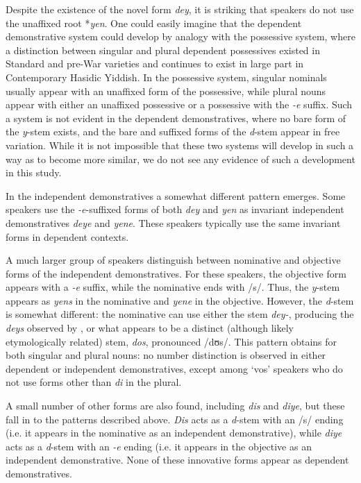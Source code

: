 \documentclass[output=paper, hidelinks]{langscibook}
\begin{document}
Despite the existence of the novel form \textit{dey}, it is striking that speakers do not use the unaffixed root *\textit{yen}. One could easily imagine that the dependent demonstrative system could develop by analogy with the possessive system, where a distinction between singular and plural dependent possessives existed in Standard and pre-War varieties and continues to exist in large part in Contemporary Hasidic Yiddish. In the possessive system, singular nominals usually appear with an unaffixed form of the possessive, while plural nouns appear with either an unaffixed possessive or a possessive with the \textit{-e} suffix. Such a system is not evident in the dependent demonstratives, where no bare form of the \textit{y}-stem exists, and the bare and suffixed forms of the \textit{d}-stem appear in free variation. While it is not impossible that these two systems will develop in such a way as to become more similar, we do not see any evidence of such a development in this study. 

\hspace*{-4.5pt}In the independent demonstratives a somewhat different pattern emerges. Some speakers use the \textit{-e}-suffixed forms of both \textit{dey} and \textit{yen} as invariant independent demonstratives \textit{deye} and \textit{yene}. These speakers typically use the same invariant forms in dependent contexts.

A much larger group of speakers distinguish between nominative and objective forms of the independent demonstratives. For these speakers, the objective form appears with a \textit{-e} suffix, while the nominative ends with /s/. Thus, the \textit{y}-stem appears as \textit{yens} in the nominative and \textit{yene} in the objective. However, the \textit{d}-stem is somewhat different: the nominative can use either the stem \textit{dey-}, producing the \textit{deys} observed by \citet{Krogh12}, or what appears to be a distinct (although likely etymologically related) stem, \textit{dos}, pronounced /dʊs/. This pattern obtains for both singular and plural nouns: no number distinction is observed in either dependent or independent demonstratives, except among `vos' speakers who do not use forms other than \textit{di} in the plural. 

A small number of other forms are also found, including \textit{dis} and \textit{diye}, but these fall in to the patterns described above. \textit{Dis} acts as a \textit{d}-stem with an /s/ ending (i.e. it appears in the nominative as an independent demonstrative), while \textit{diye} acts as a \textit{d}-stem with an \textit{-e} ending (i.e. it appears in the objective as an independent demonstrative. None of these innovative forms appear as dependent demonstratives. 
\end{document}
